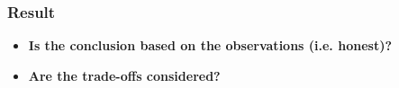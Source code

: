 \subsubsection{Result}
\begin{itemize}
\item {\bf Is the conclusion based on the observations (i.e. honest)?}\\

\item {\bf Are the trade-offs considered?}\\

\end{itemize}
